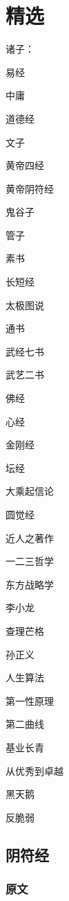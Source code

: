 \chapter{精选}

诸子：
\begin{enumbox}
\item 易经
\item 中庸
\item 道德经
\item 文子
\item 黄帝四经
\item 黄帝阴符经
\item 鬼谷子
\item 管子
\item 素书
\item 长短经
\item 太极图说
\item 通书
\item 武经七书
\item 武艺二书
\end{enumbox}

佛经
\begin{enumbox}
\item 心经
\item 金刚经
\item 坛经
\item 大乘起信论
\item 圆觉经
\end{enumbox}

近人之著作
\begin{enumbox}
\item 一二三哲学
\item 东方战略学
\item 李小龙
\item 查理芒格
\item 孙正义
\item 人生算法
\item 第一性原理
\item 第二曲线
\item 基业长青
\item 从优秀到卓越
\item 黑天鹅
\item 反脆弱
\end{enumbox}

\section{阴符经}

\subsection{原文}


